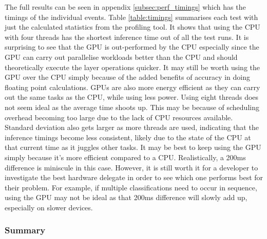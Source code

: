 \documentclass{article}
\begin{document}
The full results can be seen in appendix \ref{subsec:perf_timings} which has the timings of the individual events. Table \ref{table:timings} 
summarises each test with just the calculated statistics from the profiling tool. It shows that using the CPU with four 
threads has the shortest inference time out of all the test runs. It is surprising to see that the GPU is out-performed 
by the CPU especially since the GPU can carry out parallelise workloads better than the CPU and should theoretically 
execute the layer operations quicker. It may still be worth using the GPU over the CPU simply because of the added 
benefits of accuracy in doing floating point calculations. GPUs are also more energy efficient as they can carry out the
same tasks as the CPU, while using less power. Using eight threads does not seem ideal as the average time shoots up. 
This may be because of scheduling overhead becoming too large due to the lack of CPU resources available. 
Standard deviation also gets larger as more threads are used, indicating that the inference timings become less 
consistent, likely due to the state of the CPU at that current time as it juggles other tasks. It may be best to keep 
using the GPU simply because it's more efficient compared to a CPU. Realistically, a 200ms difference is miniscule in 
this case. However, it is still worth it for a developer to investigate the best hardware delegate in order to see 
which one performs best for their problem. For example, if multiple classifications need to occur in sequence, using 
the GPU may not be ideal as that 200ms difference will slowly add up, especially on slower devices. 

\subsubsection{Summary}
\end{document}
